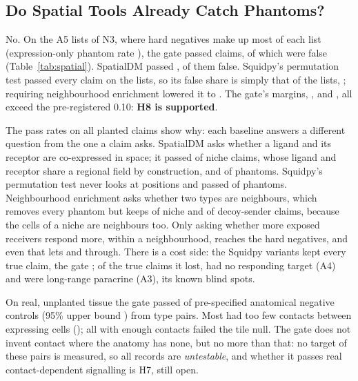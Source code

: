 \documentclass[letterpaper]{article} %
\begin{document}
\subsection{Do Spatial Tools Already Catch Phantoms?}
No. On the A5 lists of N3, where hard negatives make up most of each list (expression-only phantom rate
\hfourNthreeAfivePR{}), the gate passed \sbGateNpass{} claims, of which \sbGateFPS{} \sbGateFPSci{} were false
(Table~\ref{tab:spatial}). SpatialDM passed \sbSpatialdmNpass{}, \sbSpatialdmFPS{} of them false. Squidpy's
permutation test passed every claim on the lists, so its false share is simply that of the lists, \sbLigrecFPS{};
requiring neighbourhood enrichment lowered it to \sbNhoodFPS{}. The gate's margins, \sbSpatialdmMargin{},
\sbLigrecMargin{} and \sbNhoodMargin{}, all exceed the pre-registered 0.10: \textbf{H8 is supported}.

The pass rates on all planted claims show why: each baseline answers a different question from the one a claim asks.
SpatialDM asks whether a ligand and its receptor are co-expressed in space; it passed \pcSpatialdmNiche{} of niche
claims, whose ligand and receptor share a regional field by construction, and \pcSpatialdmPhantom{} of phantoms.
Squidpy's permutation test never looks at positions and passed \pcLigrecPhantom{} of phantoms. Neighbourhood enrichment
asks whether two types are neighbours, which removes every phantom but keeps \pcNhoodNiche{} of niche and
\pcNhoodDecoy{} of decoy-sender claims, because the cells of a niche are neighbours too. Only asking whether more
exposed receivers respond more, within a neighbourhood, reaches the hard negatives, and even that lets \pcGateNiche{}
and \pcGateDecoy{} through. There is a cost side: the Squidpy variants kept every true claim, the gate \sbGateRet{}; of
the \lossNlost{} true claims it lost, \lossNoneLost{} had no responding target (A4) and \lossParaLost{} were long-range
paracrine (A3), its known blind spots.

On real, unplanted tissue the gate passed \ncPassed{} of \ncN{} pre-specified anatomical negative controls (95\% upper
bound \ncCIhi{}) from \ncTypePairs{} type pairs. Most had too few contacts between expressing cells
(\ncFailContacts{}); all \ncContactsGeFifty{} with enough contacts failed the tile null. The gate does not invent
contact where the anatomy has none, but no more than that: no target of these pairs is measured, so all \ncUntestable{}
records are \emph{untestable}, and whether it passes real contact-dependent signalling is H7, still open.
\end{document}
